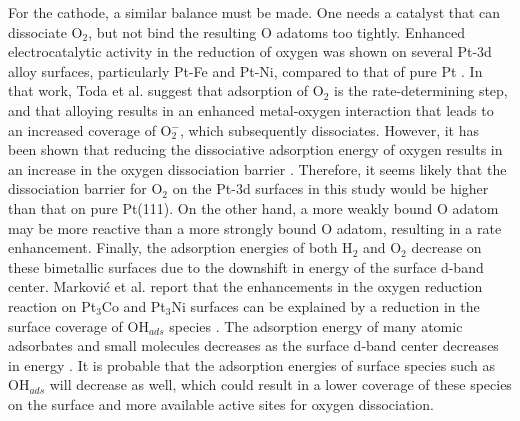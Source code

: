 \documentclass[aps,preprint,superscriptaddress,endfloats*]{revtex4}
\begin{document}
For the cathode, a similar balance must be made.  One needs a catalyst
that can dissociate O$_2$, but not bind the resulting O adatoms too
tightly.  Enhanced electrocatalytic activity in the reduction of
oxygen was shown on several Pt-3d alloy surfaces, particularly Pt-Fe
and Pt-Ni, compared to that of pure Pt \cite{toda1999}.  In that work,
Toda et al.  suggest that adsorption of O$_2$ is the rate-determining
step, and that alloying results in an enhanced metal-oxygen
interaction that leads to an increased coverage of O$_2^-$, which
subsequently dissociates.  However, it has been shown that reducing
the dissociative adsorption energy of oxygen results in an increase in
the oxygen dissociation barrier \cite{norskov2002:_univer}.
Therefore, it seems likely that the dissociation barrier for O$_2$ on
the Pt-3d surfaces in this study would be higher than that on pure
Pt(111).  On the other hand, a more weakly bound O adatom may be more
reactive than a more strongly bound O adatom, resulting in a rate
enhancement.  Finally, the adsorption energies of both H$_2$ and O$_2$
decrease on these bimetallic surfaces due to the downshift in energy
of the surface d-band center.  Markovi\'c et al. report that the
enhancements in the oxygen reduction reaction on Pt$_3$Co and Pt$_3$Ni
surfaces can be explained by a reduction in the surface coverage of
OH$_{ads}$ species \cite{markovic2001:_oxygen_pt_pt}. The adsorption
energy of many atomic adsorbates and small molecules decreases as the
surface d-band center decreases in energy \cite{norskov2002:_univer}.
It is probable that the adsorption energies of surface species such as
OH$_{ads}$ will decrease as well, which could result in a lower
coverage of these species on the surface and more available active
sites for oxygen dissociation.
\end{document}
